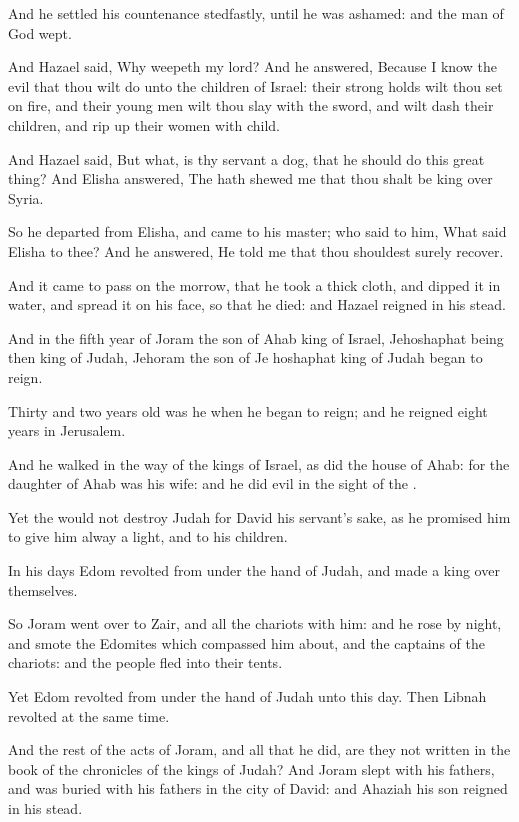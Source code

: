 \Verse And he settled his countenance stedfastly, until he was ashamed: and the man of God wept.

\Verse And Hazael said, Why weepeth my lord? And he answered, Because I know the evil that thou wilt do unto the children of Israel: their strong holds wilt thou set on fire, and their young men wilt thou slay with the sword, and wilt dash their children, and rip up their women with child.

\Verse And Hazael said, But what, is thy servant a dog, that he should do this great thing? And Elisha answered, The \LORD hath shewed me that thou shalt be king over Syria.

\Verse So he departed from Elisha, and came to his master; who said to him, What said Elisha to thee? And he answered, He told me that thou shouldest surely recover.

\Verse And it came to pass on the morrow, that he took a thick cloth, and dipped it in water, and spread it on his face, so that he died: and Hazael reigned in his stead.

\Verse And in the fifth year of Joram the son of Ahab king of Israel, Jehoshaphat being then king of Judah, Jehoram the son of Je hoshaphat king of Judah began to reign.

\Verse Thirty and two years old was he when he began to reign; and he reigned eight years in Jerusalem.

\Verse And he walked in the way of the kings of Israel, as did the house of Ahab: for the daughter of Ahab was his wife: and he did evil in the sight of the \LORD.

\Verse Yet the \LORD would not destroy Judah for David his servant's sake, as he promised him to give him alway a light, and to his children.

\Verse In his days Edom revolted from under the hand of Judah, and made a king over themselves.

\Verse So Joram went over to Zair, and all the chariots with him: and he rose by night, and smote the Edomites which compassed him about, and the captains of the chariots: and the people fled into their tents.

\Verse Yet Edom revolted from under the hand of Judah unto this day.  Then Libnah revolted at the same time.

\Verse And the rest of the acts of Joram, and all that he did, are they not written in the book of the chronicles of the kings of Judah?  \Verse And Joram slept with his fathers, and was buried with his fathers in the city of David: and Ahaziah his son reigned in his stead.

